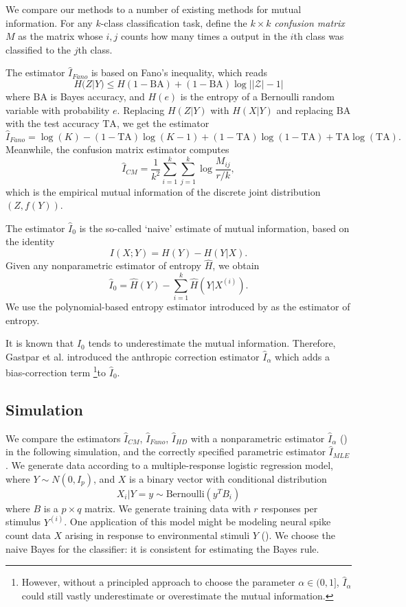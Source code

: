 We compare our methods to a number of existing methods for mutual
information.  For any $k$-class classification task, define the $k
\times k$ \emph{confusion matrix} $M$ as the matrix whose $i, j$
counts how many times a output in the $i$th class was classified to
the $j$th class.

The estimator $\hat{I}_{Fano}$ is based on Fano's inequality, which reads
\[
H(Z|Y) \leq H(1-\text{BA}) + (1-\text{BA}) \log ||\mathcal{Z}| - 1|
\]
where $\text{BA}$ is Bayes accuracy, and $H(e)$ is the entropy of a
Bernoulli random variable with probability $e$.  Replacing $H(Z|Y)$
with $H(X|Y)$ and replacing $\text{BA}$ with the test accuracy $\text{TA}$,
we get the estimator
\[
\hat{I}_{Fano} = \log(K) - (1-\text{TA}) \log(K-1) + (1-\text{TA}) \log(1-\text{TA}) + \text{TA} \log(\text{TA}).
\]
Meanwhile, the confusion matrix estimator computes
\[
\hat{I}_{CM} = \frac{1}{k^2} \sum_{i=1}^k \sum_{j=1}^k \log \frac{M_{ij}}{r/k},
\]
which is the empirical mutual information of the discrete joint
distribution $(Z, f(Y))$.

The estimator $\hat{I}_0$ is the so-called `naive' estimate of mutual information, based on the identity
\[
I(X;Y) = H(Y) - H(Y|X).
\]
Given any nonparametric estimator of entropy $\hat{H}$, we obtain
\[
\hat{I}_0 = \hat{H}(Y) - \sum_{i=1}^k \hat{H}(Y|X^{(i)}).
\]
We use the polynomial-based entropy estimator introduced by
\cite{jiao2015minimax} as the estimator of entropy.  

It is known that $\hat{I}_0$ tends to underestimate the mutual
information.  Therefore, Gastpar et al. introduced the anthropic
correction estimator $\hat{I}_\alpha$ which adds a bias-correction
term \footnote{However, without a principled approach to choose the
  parameter $\alpha \in (0,1]$, $\hat{I}_\alpha$ could still vastly
underestimate or overestimate the mutual information.}to $\hat{I}_0$.

\subsection{Simulation}

We compare the estimators $\hat{I}_{CM}$, $\hat{I}_{Fano}$,
$\hat{I}_{HD}$ with a nonparametric estimator $\hat{I}_\alpha$
(\cite{Gastpar2009}) in the following simulation, and the correctly
specified parametric estimator $\hat{I}_{MLE}$.  We generate data
according to a multiple-response logistic regression model, where $ Y
\sim N(0, I_p) $, and $X$ is a binary vector with conditional
distribution
\[
X_i|Y = y \sim \text{Bernoulli}(y^T B_i)
\]
where $B$ is a $p \times q$ matrix.  We generate training data with
$r$ responses per stimulus $Y^{(i)}$.  One application of this model
might be modeling neural spike count data $X$ arising in response to
environmental stimuli $Y$ (\cite{banerjee2012parametric}).  We choose
the naive Bayes for the classifier: it is consistent for
estimating the Bayes rule.

